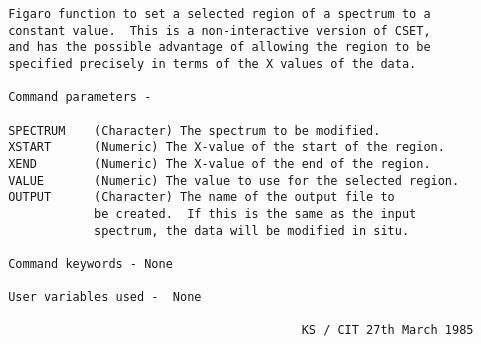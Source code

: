 \begin{description}
\begin{verbatim}
 Figaro function to set a selected region of a spectrum to a
 constant value.  This is a non-interactive version of CSET,
 and has the possible advantage of allowing the region to be
 specified precisely in terms of the X values of the data.

 Command parameters -

 SPECTRUM    (Character) The spectrum to be modified.
 XSTART      (Numeric) The X-value of the start of the region.
 XEND        (Numeric) The X-value of the end of the region.
 VALUE       (Numeric) The value to use for the selected region.
 OUTPUT      (Character) The name of the output file to
             be created.  If this is the same as the input
             spectrum, the data will be modified in situ.

 Command keywords - None

 User variables used -  None

                                          KS / CIT 27th March 1985
\end{verbatim}
\end{description}
